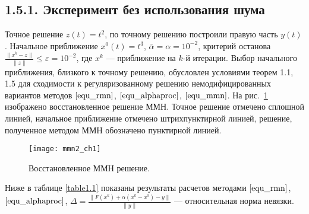 \subsection*{1.5.1. Эксперимент без использования шума}
 Точное решение $z(t)=t^2$, по точному решению построили правую часть $y(t)$. Начальное приближение $x^0(t)=t^3$, $\bar\alpha=\alpha=10^{-2}$, критерий останова $\frac{\|x^k-z\|}{\|z\|}\le\varepsilon=10^{-2}$, где $x^k$ --- приближение на $k$-й итерации. Выбор начального приближения, близкого к точному решению, обусловлен условиями теорем 1.1, 1.5 для сходимости к регуляризованному решению немодифицированных вариантов методов $\eqref{equ_rmn}$, $\eqref{equ_alphaproc}$, $\eqref{equ_mmn}$. 
 На рис.~\ref{fig:mmn_ch1} изображено восстановленное решение ММН. Точное решение отмечено сплошной линией, начальное приближение отмечено штрихпунктирной линией, решение, полученное методом ММН обозначено пунктирной линией. 
\begin{figure}[h]
	\centering
	\texttt{[image: mmn2\_ch1]}
	\caption{Восстановленное ММН решение.}
	\label{fig:mmn_ch1}
\end{figure}
Ниже в таблице \ref{table1.1} показаны результаты расчетов методами $\eqref{equ_rmn}$, $\eqref{equ_alphaproc}$, $\Delta=\frac{\|F(x^k)+\alpha(x^k-x^0)-y\|}{\|y\|}$ --- относительная норма невязки. 
